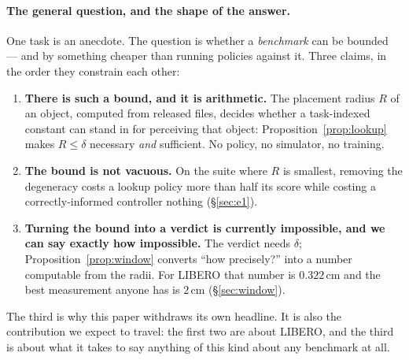\documentclass[10pt,twocolumn]{article}
\begin{document}
\paragraph{The general question, and the shape of the answer.} One task is an
anecdote. The question is whether a \emph{benchmark} can be bounded --- and by
something cheaper than running policies against it. Three claims, in the order
they constrain each other:

\begin{enumerate}\itemsep2pt
\item \textbf{There is such a bound, and it is arithmetic.} The placement
radius $R$ of an object, computed from released files, decides whether a
task-indexed constant can stand in for perceiving that object:
Proposition~\ref{prop:lookup} makes $R \le \delta$ necessary \emph{and}
sufficient. No policy, no simulator, no training.
\item \textbf{The bound is not vacuous.} On the suite where $R$ is smallest,
removing the degeneracy costs a lookup policy more than half its score while
costing a correctly-informed controller nothing (\S\ref{sec:e1}).
\item \textbf{Turning the bound into a verdict is currently impossible, and
we can say exactly how impossible.} The verdict needs $\delta$;
Proposition~\ref{prop:window} converts ``how precisely?'' into a number
computable from the radii. For LIBERO that number is $0.322$\,cm and the best
measurement anyone has is $2$\,cm (\S\ref{sec:window}).
\end{enumerate}

\noindent The third is why this paper withdraws its own headline. It is also
the contribution we expect to travel: the first two are about LIBERO, and the
third is about what it takes to say anything of this kind about any benchmark
at all.
\end{document}
